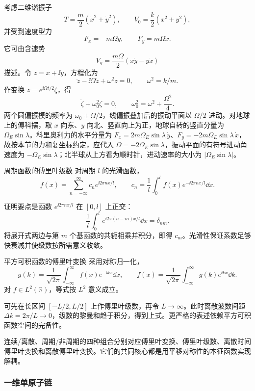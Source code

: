 考虑二维谐振子
\[
 T=\frac m2(\dot x^2+\dot y^2),\qquad
 V_0=\frac k2(x^2+y^2),
\]
并受到速度型力
\[
 F_x=-m\Omega\dot y,\qquad F_y=m\Omega\dot x.
\]
它可由含速势
\[
 V_g=\frac{m\Omega}{2}(x\dot y-y\dot x)
\]
描述。令 $z=x+\ii y$，方程化为
\begin{equation}\label{advA1:eq:foucault-complex}
 \ddot z-\ii\Omega\dot z+\omega^2z=0,
 \qquad \omega^2=k/m.
\end{equation}
作变换 $z=e^{\ii\Omega t/2}\zeta$，得
\[
 \ddot\zeta+\omega_0^2\zeta=0,
 \qquad \omega_0^2=\omega^2+\frac{\Omega^2}{4}.
\]
两个圆偏振模的频率为 $\omega_0\pm\Omega/2$，线偏振叠加后的振动平面以 $\Omega/2$ 进动。对地球上的傅科摆，取 $x$ 向东、$y$ 向北、竖直向上为正，地球自转的竖直分量为 $\Omega_E\sin\lambda$。科里奥利力的水平分量为 $F_x=2m\Omega_E\sin\lambda\,\dot y$、$F_y=-2m\Omega_E\sin\lambda\,\dot x$，故按本节的力和复坐标约定，应代入
$\Omega=-2\Omega_E\sin\lambda$，振动平面的有符号进动角速度为 $-\Omega_E\sin\lambda$；北半球从上方看为顺时针，进动速率的大小为 $|\Omega_E\sin\lambda|$。

\begin{advtheorem}{周期函数的傅里叶级数}\label{advA1:thm:fourier-series}
对周期 $l$ 的光滑函数，
\[
 f(x)=\sum_{n=-\infty}^{\infty}c_n e^{\ii2\pi nx/l},
 \qquad c_n=\frac1l\int_0^l f(x)e^{-\ii2\pi nx/l}\dd x.
\]
\end{advtheorem}
证明要点是函数 $e^{\ii2\pi nx/l}$ 在 $[0,l]$ 上正交：
\[
 \frac1l\int_0^l e^{\ii2\pi(n-m)x/l}\dd x=\delta_{nm}.
\]
将展开式两边与第 $m$ 个基函数的共轭相乘并积分，即得 $c_m$。光滑性保证系数足够快衰减并使级数按所需意义收敛。

\begin{advtheorem}{平方可积函数的傅里叶变换}\label{advA1:thm:fourier-transform}
采用对称归一化，
\[
 g(k)=\frac1{\sqrt{2\pi}}\int_{-\infty}^{\infty}f(x)e^{-\ii kx}\dd x,
 \qquad
 f(x)=\frac1{\sqrt{2\pi}}\int_{-\infty}^{\infty}g(k)e^{\ii kx}\dd k.
\]
对 $f\in L^2(\mathbb R)$，等式按 $L^2$ 意义成立。
\end{advtheorem}
可先在长区间 $[-L/2,L/2]$ 上作傅里叶级数，再令
$L\to\infty$。此时离散波数间距 $\Delta k=2\pi/L\to0$，级数的黎曼和趋于积分，得到上式。更严格的表述依赖平方可积函数空间的完备性。

连续/离散、周期/非周期的四种组合分别对应傅里叶变换、傅里叶级数、离散时间傅里叶变换和离散傅里叶变换。它们的共同核心都是用平移对称性的本征函数实现解耦。

\subsubsection{一维单原子链}

